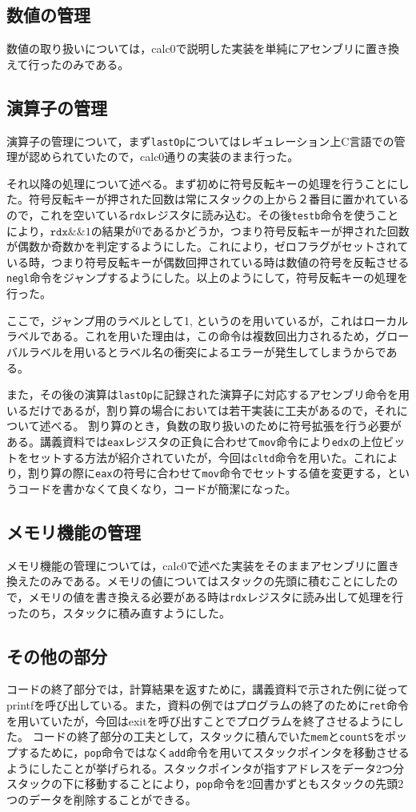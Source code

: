 \documentclass[a4paper]{jsarticle}
\newcommand{\var}[1]{\texttt{#1}}
\begin{document}
\subsection{数値の管理}
数値の取り扱いについては，calc0で説明した実装を単純にアセンブリに置き換えて行ったのみである。

\subsection{演算子の管理}
演算子の管理について，まず\var{lastOp}についてはレギュレーション上C言語での管理が認められていたので，calc0通りの実装のまま行った。

それ以降の処理について述べる。まず初めに符号反転キーの処理を行うことにした。符号反転キーが押された回数は常にスタックの上から２番目に置かれているので，これを空いている\var{rdx}レジスタに読み込む。その後\var{testb}命令を使うことにより，$\var{rdx} \&\& 1$の結果が0であるかどうか，つまり符号反転キーが押された回数が偶数か奇数かを判定するようにした。これにより，ゼロフラグがセットされている時，つまり符号反転キーが偶数回押されている時は数値の符号を反転させる\var{negl}命令をジャンプするようにした。以上のようにして，符号反転キーの処理を行った。

ここで，ジャンプ用のラベルとして1, というのを用いているが，これはローカルラベルである。これを用いた理由は，この命令は複数回出力されるため，グローバルラベルを用いるとラベル名の衝突によるエラーが発生してしまうからである。

また，その後の演算は\var{lastOp}に記録された演算子に対応するアセンブリ命令を用いるだけであるが，割り算の場合においては若干実装に工夫があるので，それについて述べる。
割り算のとき，負数の取り扱いのために符号拡張を行う必要がある。講義資料では\var{eax}レジスタの正負に合わせて\var{mov}命令により\var{edx}の上位ビットをセットする方法が紹介されていたが，今回は\var{cltd}命令を用いた。これにより，割り算の際に\var{eax}の符号に合わせて\var{mov}命令でセットする値を変更する，というコードを書かなくて良くなり，コードが簡潔になった。

\subsection{メモリ機能の管理}
メモリ機能の管理については，calc0で述べた実装をそのままアセンブリに置き換えたのみである。メモリの値についてはスタックの先頭に積むことにしたので，メモリの値を書き換える必要がある時は\var{rdx}レジスタに読み出して処理を行ったのち，スタックに積み直すようにした。

\subsection{その他の部分}
コードの終了部分では，計算結果を返すために，講義資料で示された例に従ってprintfを呼び出している。また，資料の例ではプログラムの終了のために\var{ret}命令を用いていたが，今回はexitを呼び出すことでプログラムを終了させるようにした。
コードの終了部分の工夫として，スタックに積んでいた\var{mem}と\var{countS}をポップするために，\var{pop}命令ではなく\var{add}命令を用いてスタックポインタを移動させるようにしたことが挙げられる。スタックポインタが指すアドレスをデータ2つ分スタックの下に移動することにより，\var{pop}命令を2回書かずともスタックの先頭2つのデータを削除することができる。
\end{document}
